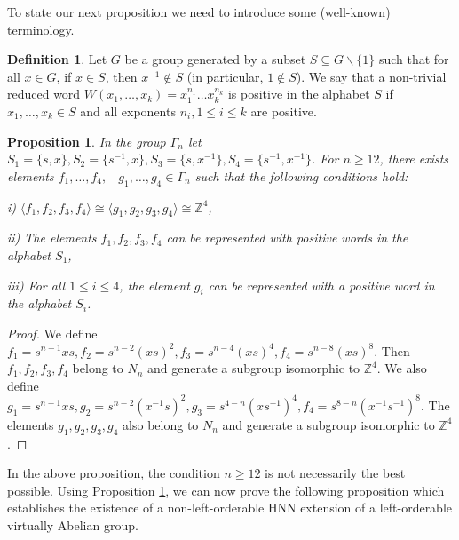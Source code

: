 \documentclass[12pt]{amsart}
\newtheorem{prop}[thm]{Proposition}
\theoremstyle{definition}
\newtheorem{defn}[thm]{Definition}
\begin{document}
 \medskip
 
  To state our next proposition we need to introduce some (well-known) terminology. 
 
 \medskip
 
  \begin{defn} Let $G$ be a group generated by a subset $S\subseteq G\backslash \{1\}$ such that for all $x\in G$, if $x\in S$, then $x^{-1}\notin S$ (in particular, $1\notin S$). We say that a non-trivial reduced word $W(x_1, \dots , x_k) = x_1^{n_1}\dots x_k^{n_k}$ is positive in the alphabet $S$ if $x_1, \dots , x_k\in S$ and all exponents $n_i, 1\leq i\leq k$ are positive.  
  \end{defn}
  
  \medskip
  
  \begin{prop} \label{thm:gamma} In the group $\Gamma _n$ let $S_1 = \{s,x\}, S_2 = \{s^{-1},x\}, S_3 = \{s,x^{-1}\}, S_4 = \{s^{-1},x^{-1}\}$. For $n\geq 12$, there exists elements $f_1, \dots, f_4,$ \ $g_1, \dots , g_4\in \Gamma _n$ such that the following conditions hold:
  
  i) $\langle f_1, f_2, f_3, f_4\rangle \cong \langle g_1, g_2, g_3, g_4\rangle \cong \mathbb{Z}^4$, 
  
  ii) The elements $f_1, f_2, f_3, f_4$ can be represented with positive words in the alphabet $S_1$, 
  
  iii) For all $1\leq i\leq 4$, the element $g_i$ can be represented with a positive word in the alphabet $S_i$.
  \end{prop}
  
  \medskip
  
  \begin{proof} We define $f_1 = s^{n-1}xs, f_2 = s^{n-2}(xs)^2, f_3 = s^{n-4}(xs)^4, f_4 = s^{n-8}(xs)^8$. Then $f_1, f_2, f_3, f_4$ belong to $N_n$ and generate a subgroup isomorphic to $\mathbb{Z}^4$. We also define $g_1 = s^{n-1}xs, g_2 = s^{n-2}(x^{-1}s)^2, g_3 = s^{4-n}(xs^{-1})^4, f_4 = s^{8-n}(x^{-1}s^{-1})^8$. The elements $g_1, g_2, g_3, g_4$ also belong to $N_n$ and generate a subgroup isomorphic to $\mathbb{Z}^4$. 
  \end{proof}
  
  \medskip
  
  In the above proposition, the condition $n\geq 12$ is not necessarily the best possible. Using Proposition \ref{thm:gamma}, we can now prove the following proposition which establishes the existence of a non-left-orderable HNN extension of a left-orderable virtually Abelian group.
  
\end{document}
